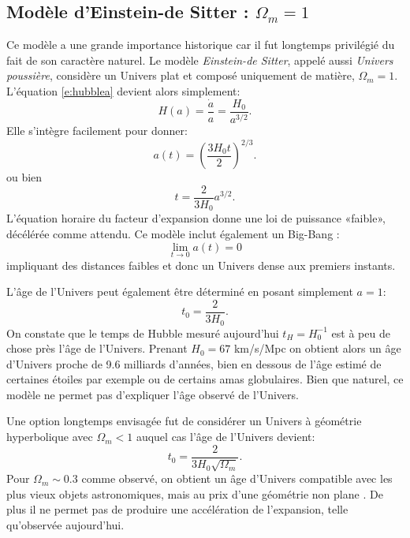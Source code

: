 \subsection{Modèle d'Einstein-de Sitter : $\Omega_m=1$}
Ce modèle a une grande importance historique car il fut longtemps privilégié du fait de son caractère naturel. Le modèle \textit{Einstein-de Sitter}, appelé aussi \textit{Univers poussière}, considère un Univers plat et composé uniquement de matière, $\Omega_m=1$.  L'équation \ref{e:hubblea} devient alors simplement:
\begin{equation}
H(a)=\frac{\dot a}{a}=\frac{H_0}{a^{3/2 }}.
\end{equation}
Elle s'intègre facilement pour donner:
\begin{equation}
a(t)=\left(\frac{3H_0t}{2}\right)^{2/3}.
\end{equation}
ou bien
\begin{equation}
t=\frac{2}{3H_0}a^{3/2}.
\end{equation}
L'équation horaire du facteur d'expansion donne une loi de puissance «faible», décélérée comme attendu. Ce modèle inclut également un Big-Bang :
\begin{equation}
\lim_{t \to 0} a(t)=0
\end{equation}
impliquant des distances faibles et donc un Univers dense aux premiers instants.

L'âge de l'Univers peut également être déterminé en posant simplement $a=1$:
\begin{equation}
t_0=\frac{2}{3H_0}.
\end{equation}
On constate que le temps de Hubble mesuré aujourd'hui $t_H=H_0^{-1}$ est à peu de chose près l'âge de l'Univers. Prenant $H_0=67$ km/s/Mpc on obtient alors un âge d'Univers proche de 9.6 milliards d'années, bien en dessous de l'âge estimé de certaines étoiles par exemple ou de certains amas globulaires.  Bien que naturel, ce modèle ne permet pas d'expliquer l'âge observé de l'Univers. 

Une option longtemps envisagée fut de considérer un Univers à géométrie hyperbolique avec $\Omega_m<1$ auquel cas l'âge de l'Univers devient:
\begin{equation}
t_0=\frac{2}{3H_0\sqrt{\Omega_m}}.
\end{equation}
Pour $\Omega_m\sim0.3$ comme observé, on obtient un âge d'Univers compatible avec les plus vieux objets astronomiques, mais au prix d'une géométrie non plane . De plus il ne permet pas de produire une accélération de l'expansion, telle qu'observée aujourd'hui.

